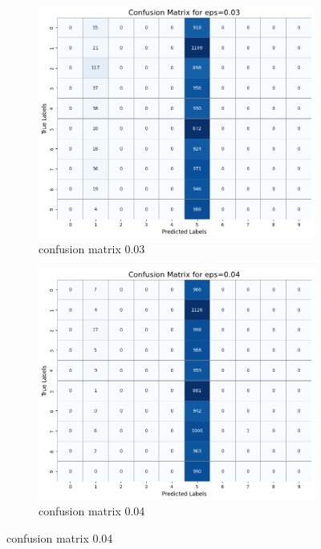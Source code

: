 \documentclass[11pt,onside]{article}
\begin{document}
\begin{figure}[h]
  \centering
  \begin{subfigure}[b]{0.49\textwidth}
    \centering
    \includegraphics[width=\textwidth]{V2_images/confusion_matrix_eps_0.03.png}
    \caption{confusion matrix 0.03}
    \label{fig:image1}
  \end{subfigure}
  \hfill
  \begin{subfigure}[b]{0.49\textwidth}
    \centering
    \includegraphics[width=\textwidth]{V2_images/confusion_matrix_eps_0.04.png}
    \caption{confusion matrix 0.04}
    \label{fig:image2}
  \end{subfigure}

  \label{fig:images}
\end{figure}
\end{document}
